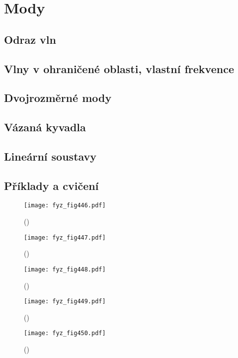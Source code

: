 \chapter{Mody}\label{fyz:IchapIL}
\minitoc
  \section{Odraz vln}\label{fyz:IchapILsecI}
  \section{Vlny v ohraničené oblasti, vlastní frekvence}\label{fyz:IchapILsecII}
  \section{Dvojrozměrné mody}\label{fyz:IchapILsecIII}
  \section{Vázaná kyvadla}\label{fyz:IchapILsecIV}
  \section{Lineární soustavy}\label{fyz:IchapILsecV}
  \section{Příklady a cvičení}\label{fyz:IchapILsecVI}

    \begin{figure}[ht!] %
      \centering
      \texttt{[image: fyz\_fig446.pdf]}
      \caption{ 
               (\cite[s.~707]{Feynman01})}
      \label{fyz_fig446}
    \end{figure}

    \begin{figure}[ht!] %
      \centering
      \texttt{[image: fyz\_fig447.pdf]}
      \caption{ 
               (\cite[s.~707]{Feynman01})}
      \label{fyz_fig447}
    \end{figure}

    \begin{figure}[ht!] %
      \centering
      \texttt{[image: fyz\_fig448.pdf]}
      \caption{ 
               (\cite[s.~707]{Feynman01})}
      \label{fyz_fig448}
    \end{figure}

    \begin{figure}[ht!] %
      \centering
      \texttt{[image: fyz\_fig449.pdf]}
      \caption{ 
               (\cite[s.~707]{Feynman01})}
      \label{fyz_fig449}
    \end{figure}

    \begin{figure}[ht!] %
      \centering
      \texttt{[image: fyz\_fig450.pdf]}
      \caption{ 
               (\cite[s.~707]{Feynman01})}
      \label{fyz_fig450}
    \end{figure}